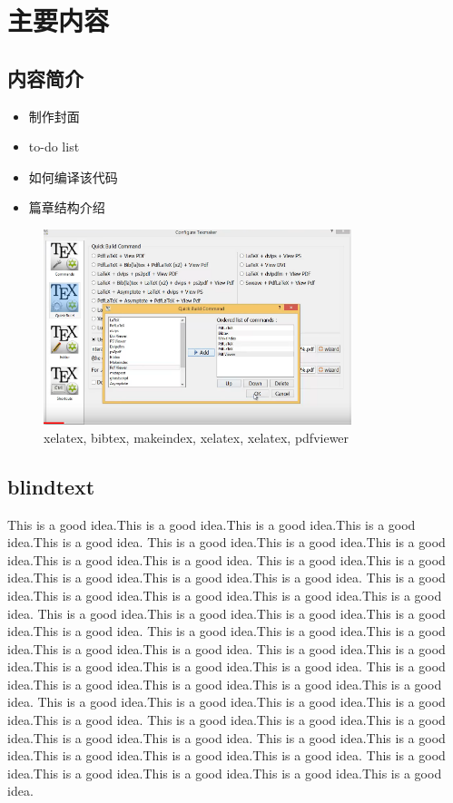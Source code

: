 
\chapter{主要内容}

\section{内容简介}

\begin{itemize}
	\item 制作封面
	\item to-do list
	\item 如何编译该代码
	\item 篇章结构介绍
\end{itemize}

\begin{figure}[!h]
	\includegraphics[width=0.8\textwidth]{figures/compiler_set.png}
	\caption{xelatex, bibtex, makeindex, xelatex, xelatex, pdfviewer}
\end{figure}


\section{blindtext}

\blindtext %


This is a good idea.This is a good idea.This is a good idea.This is a good idea.This is a good idea.
This is a good idea.This is a good idea.This is a good idea.This is a good idea.This is a good idea.
This is a good idea.This is a good idea.This is a good idea.This is a good idea.This is a good idea.
This is a good idea.This is a good idea.This is a good idea.This is a good idea.This is a good idea.
This is a good idea.This is a good idea.This is a good idea.This is a good idea.This is a good idea.
This is a good idea.This is a good idea.This is a good idea.This is a good idea.This is a good idea.
This is a good idea.This is a good idea.This is a good idea.This is a good idea.This is a good idea.
This is a good idea.This is a good idea.This is a good idea.This is a good idea.This is a good idea.
This is a good idea.This is a good idea.This is a good idea.This is a good idea.This is a good idea.
This is a good idea.This is a good idea.This is a good idea.This is a good idea.This is a good idea.
This is a good idea.This is a good idea.This is a good idea.This is a good idea.This is a good idea.
This is a good idea.This is a good idea.This is a good idea.This is a good idea.This is a good idea.

